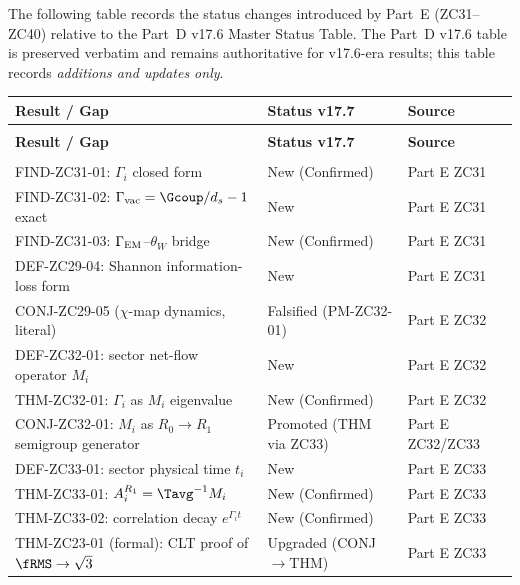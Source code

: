 \documentclass[12pt, a4paper]{article}
\begin{document}
The following table records the status changes introduced by Part~E
(ZC31--ZC40) relative to the Part~D v17.6 Master Status Table.
The Part~D v17.6 table is preserved verbatim and remains
authoritative for v17.6-era results; this table records
\emph{additions and updates only}.

\medskip

{\small
\setlength{\LTpre}{4pt}
\setlength{\LTpost}{4pt}
\renewcommand{\arraystretch}{1.30}
\begin{longtable}{>{\raggedright\arraybackslash}p{6.4cm}
                  >{\centering\arraybackslash}p{2.6cm}
                  >{\raggedright\arraybackslash}p{3.6cm}}
\toprule
\textbf{Result / Gap} & \textbf{Status v17.7} & \textbf{Source} \\
\midrule
\endfirsthead
\multicolumn{3}{l}{\small\textit{(continued)}} \\[4pt]
\toprule
\textbf{Result / Gap} & \textbf{Status v17.7} & \textbf{Source} \\
\midrule
\endhead
\midrule
\multicolumn{3}{r}{\small\textit{(continues)}} \\
\endfoot
\bottomrule
\endlastfoot
FIND-ZC31-01: $\Gamma_i$ closed form & New (Confirmed) & Part E ZC31 \\
FIND-ZC31-02: $\Gamma_{\rm vac} = \Gcoup/d_s - 1$ exact & New & Part E ZC31 \\
FIND-ZC31-03: $\Gamma_{\rm EM}$--$\theta_W$ bridge & New (Confirmed) & Part E ZC31 \\
DEF-ZC29-04: Shannon information-loss form & New & Part E ZC31 \\
CONJ-ZC29-05 ($\chi$-map dynamics, literal) & Falsified (PM-ZC32-01) & Part E ZC32 \\
DEF-ZC32-01: sector net-flow operator $M_i$ & New & Part E ZC32 \\
THM-ZC32-01: $\Gamma_i$ as $M_i$ eigenvalue & New (Confirmed) & Part E ZC32 \\
CONJ-ZC32-01: $M_i$ as $R_0\to R_1$ semigroup generator & Promoted (THM via ZC33) & Part E ZC32/ZC33 \\
DEF-ZC33-01: sector physical time $t_i$ & New & Part E ZC33 \\
THM-ZC33-01: $A_i^{R_1} = \Tavg^{-1}M_i$ & New (Confirmed) & Part E ZC33 \\
THM-ZC33-02: correlation decay $e^{\Gamma_i t}$ & New (Confirmed) & Part E ZC33 \\
THM-ZC23-01 (formal): CLT proof of $\fRMS\to\sqrt{3}$ & Upgraded (CONJ$\to$THM) & Part E ZC33 \\

\end{longtable}}
\end{document}
